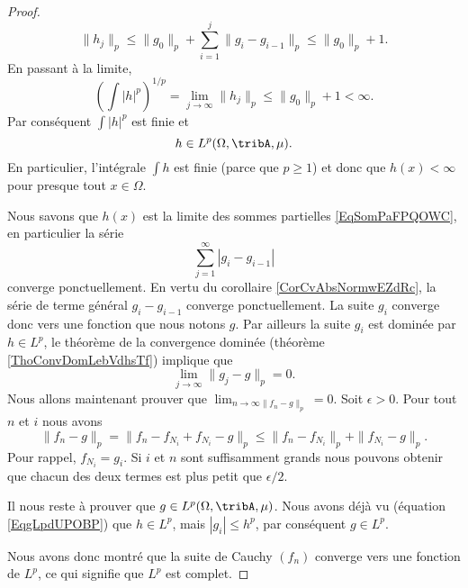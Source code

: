 \begin{proof}
    \begin{equation}
        \|h_j\|_p\leq \|g_0\|_p+\sum_{i=1}^j\|g_i-g_{i-1}\|_p\leq \|g_0\|_p+1.
    \end{equation}
    En passant à la limite,
    \begin{equation}
        \left( \int| h |^p \right)^{1/p}=\lim_{j\to \infty}\|h_j\|_p \leq \|g_0\|_p+1<\infty.
    \end{equation}
    Par conséquent \( \int| h |^p\) est finie et
    \begin{equation}    \label{EqgLpdUPOBP}
        h\in L^p(\Omega,\tribA,\mu).
    \end{equation}
    En particulier, l'intégrale \( \int h\) est finie (parce que \( p\geq 1\)) et donc que \( h(x)<\infty\) pour presque tout \( x\in\Omega\).

    Nous savons que \( h(x)\) est la limite des sommes partielles \eqref{EqSomPaFPQOWC}, en particulier la série
    \begin{equation}
        \sum_{j=1}^{\infty}| g_i-g_{i-1} |
    \end{equation}
    converge ponctuellement. En vertu du corollaire \ref{CorCvAbsNormwEZdRc}, la série de terme général \( g_i-g_{i-1}\) converge ponctuellement. La suite \( g_i\) converge donc vers une fonction que nous notons \( g\). Par ailleurs la suite \( g_i\) est dominée par \( h\in L^p\), le théorème de la convergence dominée (théorème \ref{ThoConvDomLebVdhsTf}) implique que
    \begin{equation}
        \lim_{j\to \infty} \|g_j-g\|_p=0.
    \end{equation}
    Nous allons maintenant prouver que \( \lim_{n\to \infty\|f_n-g\|_p} =0\). Soit \( \epsilon>0\). Pour tout \( n\) et \( i\) nous avons
    \begin{equation}
        \|f_n-g\|_p=\|f_n-f_{N_i}+f_{N_i}-g\|_p\leq\|f_n-f_{N_i}\|_p+\|f_{N_i}-g\|_p.
    \end{equation}
    Pour rappel, \( f_{N_i}=g_i\). Si \(i\) et \( n\) sont suffisamment grands nous pouvons obtenir que chacun des deux termes est plus petit que \( \epsilon/2\).

    Il nous reste à prouver que \( g\in L^p(\Omega,\tribA,\mu)\). Nous avons déjà vu (équation \eqref{EqgLpdUPOBP}) que \( h\in L^p\), mais \( | g_i |\leq h^p\), par conséquent  \( g\in L^p\).

    Nous avons donc montré que la suite de Cauchy \( (f_n)\) converge vers une fonction de \( L^p\), ce qui signifie que \( L^p\) est complet.
\end{proof}

